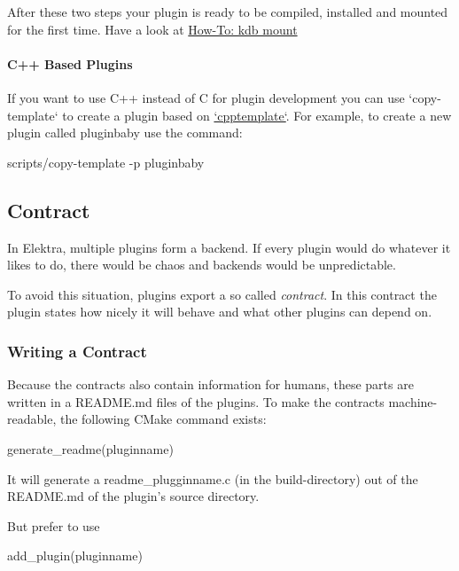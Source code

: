 After these two steps your plugin is ready to be compiled, installed and mounted for the first time. Have a look at \hyperlink{doc_tutorials_mount_md}{How-\/\+To\+: kdb mount}

\paragraph*{C++ Based Plugins}

If you want to use C++ instead of C for plugin development you can use `copy-\/template` to create a plugin based on \hyperlink{md_src_plugins_cpptemplate_README_src_plugins_cpptemplate_README_md}{`cpptemplate`}. For example, to create a new plugin called {\ttfamily pluginbaby} use the command\+:


\begin{DoxyCode}
scripts/copy-template -p pluginbaby
\end{DoxyCode}


\subsection*{Contract}

In Elektra, multiple plugins form a backend. If every plugin would do whatever it likes to do, there would be chaos and backends would be unpredictable.

To avoid this situation, plugins export a so called {\itshape contract}. In this contract the plugin states how nicely it will behave and what other plugins can depend on.

\subsubsection*{Writing a Contract}

Because the contracts also contain information for humans, these parts are written in a {\ttfamily R\+E\+A\+D\+M\+E.\+md} files of the plugins. To make the contracts machine-\/readable, the following C\+Make command exists\+:


\begin{DoxyCode}
generate\_readme(pluginname)
\end{DoxyCode}


It will generate a {\ttfamily readme\+\_\+plugginname.\+c} (in the build-\/directory) out of the R\+E\+A\+D\+M\+E.\+md of the plugin’s source directory.

But prefer to use


\begin{DoxyCode}
add\_plugin(pluginname)
\end{DoxyCode}


